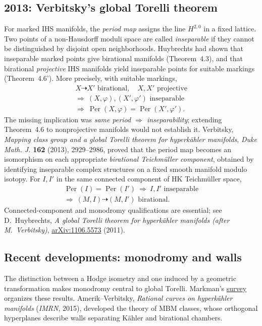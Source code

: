 \documentclass[11pt]{article}
\begin{document}
\subsection{2013: Verbitsky's global Torelli theorem}
For marked IHS manifolds, the \emph{period map}
assigns the line $H^{2,0}$ in a fixed
lattice. Two points of a non-Hausdorff
moduli space are called \emph{inseparable}
if they cannot be distinguished by disjoint
open neighborhoods. Huybrechts had shown
that inseparable marked points give
birational manifolds (Theorem~4.3), and
that birational \emph{projective} IHS
manifolds yield inseparable points for
suitable markings (Theorem~4.6').
More precisely, with suitable markings,
\[
\begin{gathered}
X\dashrightarrow X'\text{ birational},\quad X,X'\text{ projective}
\\[2pt]
\Longrightarrow\ (X,\varphi),(X',\varphi')\text{ inseparable}
\\[2pt]
\Longrightarrow\ \operatorname{Per}(X,\varphi)=\operatorname{Per}(X',\varphi').
\end{gathered}
\]
The missing implication was
\emph{same period $\Rightarrow$ inseparability};
extending Theorem~4.6 to nonprojective
manifolds would not establish it.
Verbitsky, \emph{Mapping class group and a global
Torelli theorem for hyperk\"ahler manifolds},
\emph{Duke Math. J.} \textbf{162} (2013),
2929--2986, proved that the period map
becomes an isomorphism on each appropriate
\emph{birational Teichm\"uller component},
obtained by identifying inseparable
complex structures on a fixed smooth
manifold modulo isotopy.
For $I,I'$ in the same connected component
of HK Teichm\"uller space,
\[
\begin{gathered}
\operatorname{Per}(I)=\operatorname{Per}(I')
\ \Longrightarrow\ I,I'\text{ inseparable}
\\[2pt]
\Longrightarrow\ (M,I)\dashrightarrow(M,I')\text{ birational}.
\end{gathered}
\]
Connected-component
and monodromy qualifications are essential;
see D.~Huybrechts,
\emph{A global Torelli theorem for hyperk\"ahler
manifolds (after M.~Verbitsky)},
\href{https://arxiv.org/abs/1106.5573}
{arXiv:1106.5573} (2011).

\subsection{Recent developments: monodromy and walls}
The distinction between a Hodge isometry
and one induced by a geometric transformation
makes monodromy central to global Torelli.
Markman's
\href{https://arxiv.org/abs/1101.4606}
{survey} organizes these results.
Amerik--Verbitsky, \emph{Rational curves
on hyperk\"ahler manifolds} (\emph{IMRN},
2015), developed the theory of MBM
classes, whose orthogonal hyperplanes
describe walls separating K\"ahler
and birational chambers.
\end{document}
